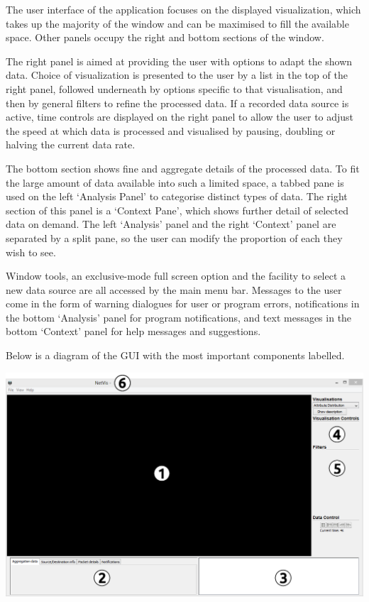 
The user interface of the application focuses on the displayed
visualization, which takes up the majority of the window and can be maximised
to fill the available space. Other panels occupy the right and bottom sections
of the window.

The right panel is aimed at providing the user with options to adapt the shown data.
Choice of visualization is presented to the user by a list in the top of the
right panel, followed underneath by options specific to that visualisation, and
then by general filters to refine the processed data. If a recorded data source
is active, time controls are displayed on the right panel to allow the user to
adjust the speed at which data is processed and visualised by pausing,
doubling or halving the current data rate. 

The bottom section shows fine and aggregate details of the
processed data. To fit the large amount of data available into such a limited
space, a tabbed pane is used on the left `Analysis Panel' to categorise
distinct types of data. The right section of this panel is a `Context Pane',
which shows further detail of selected data on demand. The left
`Analysis' panel and the right `Context' panel are separated by a split
pane, so the user can modify the proportion of each they wish to see.


Window tools, an exclusive-mode full screen option and the facility to select
a new data source are all accessed by the main menu bar. Messages to the user
come in the form of warning dialogues for user or program errors, notifications
in the bottom `Analysis' panel for program notifications, and text messages in
the bottom `Context' panel for help messages and suggestions.

Below is a diagram of the GUI with the most important components labelled.

\includegraphics[width=\linewidth]{materials/layout-diagram.png}

